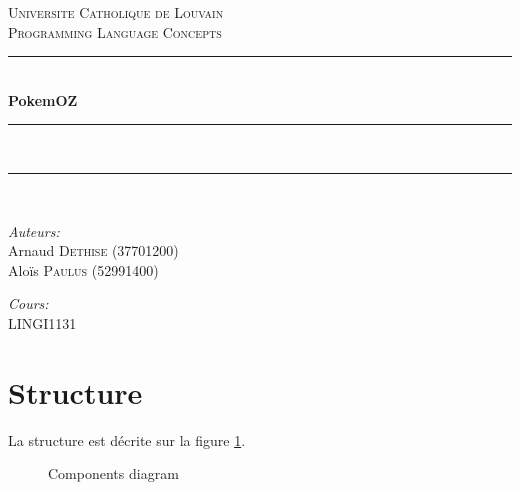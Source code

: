\documentclass[a4paper,10pt]{article}
\newcommand{\HRule}{\rule{\linewidth}{0.5mm}}
\begin{document}
\begin{titlepage}
  \begin{center}


    \textsc{\Large Universite Catholique de Louvain}\\[1cm]

    \textsc{\LARGE{ Programming Language Concepts}}\\[1cm]


    \HRule \\[0.35cm]
    {\huge \bfseries PokemOZ}\\
    \HRule \\[0.35cm]
        \end{center}
    \begin{center}
    \HRule \\[0.2cm]
  \end{center}

    \begin{minipage}{0.48\textwidth}
      \begin{flushleft} \large
        \textit{Auteurs:}\\
        Arnaud \textsc{Dethise} (37701200)\\
        Aloïs \textsc{Paulus} (52991400)\\  \vspace{0.3cm}
        
      \end{flushleft}
    \end{minipage}
    \begin{minipage}{0.48\textwidth}
      \begin{flushright} \large
        \textit{Cours:} \\
        LINGI1131 \\ \vspace{0.3cm} 
       
      \end{flushright}
    \end{minipage}

    \vfill

\end{titlepage}

\section{Structure}
La structure est décrite sur la figure \ref{compo}.
\begin{figure}[!h]
	\label{compo}
	\caption{Components diagram}
\end{figure}
\end{document}

